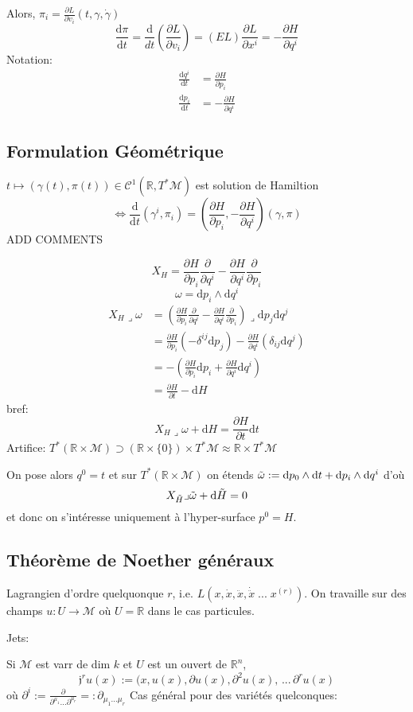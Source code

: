 \documentclass[a4paper,11pt]{article}
\renewcommand{\d}{{\mathrm{d}}}
\newcommand{\dr}[2]{\frac{\partial {#1}}{\partial{#2}}}
\begin{document}
Alors, $\pi_i = \dr{L}{v_i}(t,\gamma,\dot\gamma)$
$$\frac{\d \pi}{\d t} = \frac{\d}{d t}(\dr{L}{v_i}) = (EL) \dr{L}{x^i} = -\dr{H}{q^i}$$
Notation:
\begin{align*}
\frac{\d q^i}{\d t} &= \dr H{p_i}\\
\frac{\d p_i}{\d t} &= -\dr H{q^i}
\end{align*}

\subsection{Formulation Géométrique}
$t\mapsto (\gamma(t), \pi(t)) \in \mathcal{C}^1(\mathbb{R},T^*\mathcal{M})$ est solution de Hamiltion
$$\iff \frac{\d}{\d t}(\gamma^i, \pi_i) = (\dr H{p_i},-\dr H{q^i})(\gamma,\pi)$$
ADD COMMENTS

$$X_H = \dr H{p_i} \dr{}{q^i}-\dr H{q^i}\dr{}{p_i}$$
$$\omega = \d p_i \wedge \d q^i$$
\begin{align*}
X_H \lrcorner \omega
&= (\dr H{p_i} \dr{}{q^i}-\dr H{q^i}\dr{}{p_i}) \lrcorner \d p_j\d q^j\\
&= \dr H {p_i} (-\delta^{ij} \d p_j) - \dr H {q^i}(\delta_{ij}\d q^j)\\
&= - (\dr H {p_i} \d p_i + \dr H {q^i} \d q^i)\\
&=\dr H t - \d H
\end{align*}
bref:
$$\boxed{X_H \lrcorner \omega + \d H = \dr H t \d t}$$
Artifice: $T^*(\mathbb{R}\times\mathcal{M}) \supset (\mathbb{R}\times\{0\})\times T^*\mathcal{M}\approx\mathbb{R}\times T^*\mathcal{M} $

On pose alors $q^0 = t$ et sur $T^*(\mathbb{R}\times\mathcal{M})$ on étends $\Tilde \omega:= \d p_0 \wedge \d t + \d p_i \wedge \d q^i$ d'où
$$X_{\Tilde H} \lrcorner \Tilde \omega + \d \Tilde H=0$$
et donc on s'intéresse uniquement à l'hyper-surface $p^0 = H$.

\subsection{Théorème de Noether généraux}
Lagrangien d'ordre quelquonque $r$, i.e. $L(x, \dot x, \ddot x, \dot{\ddot x}\;...\; x^{(r)})$. On travaille sur des champs $u:U\to\mathcal{M}$ où $U=\mathbb{R}$ dans le cas particules.

Jets:

Si $\mathcal{M}$ est varr de dim $k$ et $U$ est un ouvert de $\mathbb{R}^n$, 
$$\mathfrak{j}^r u (x) := (x, u(x), \partial u(x), \partial^2 u(x), \,...\, \partial^r u (x)$$
où $\partial^i := \dr{}{^{\mu_1}...\partial^{\mu_r}} =: \partial_{\mu_1...\mu_r}$
Cas général pour des variétés quelconques:
\end{document}
